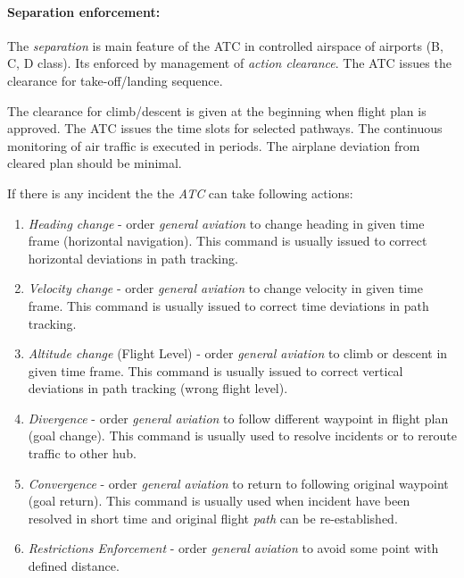 \paragraph{Separation enforcement:} The \emph{separation} is main feature of the ATC in controlled airspace of airports (B, C, D class). Its enforced by management of \emph{action clearance}. The ATC issues the clearance for take-off/landing sequence. 

The clearance for climb/descent is given at the beginning when flight plan is approved. The ATC issues the time slots for selected pathways. The continuous monitoring of air traffic is executed in periods. The airplane deviation from cleared plan should be minimal. 

If there is any incident the the \emph{ATC} can take following actions:
\begin{enumerate}
    
    \item \emph{Heading change} - order \emph{general aviation} to change heading in given time frame (horizontal navigation). This command is usually issued to correct horizontal deviations in path tracking.
    
    \item \emph{Velocity change} - order \emph{general aviation} to change velocity in given time frame. This command is usually issued to correct time deviations in path tracking.
    
    \item \emph{Altitude change} (Flight Level) - order \emph{general aviation} to climb or descent in given time frame. This command is usually issued to correct vertical deviations in path tracking (wrong flight level).
    
    \item \emph{Divergence} - order \emph{general aviation} to follow different waypoint in flight plan (goal change). This command is usually used to resolve incidents or to reroute traffic to other hub.
    
    \item \emph{Convergence} - order \emph{general aviation} to return to following original waypoint (goal return). This command is usually used when incident have been resolved in short time and original flight \emph{path} can be re-established.
    
    \item \emph{Restrictions Enforcement} - order \emph{general aviation} to avoid some point with defined distance.  
\end{enumerate}

